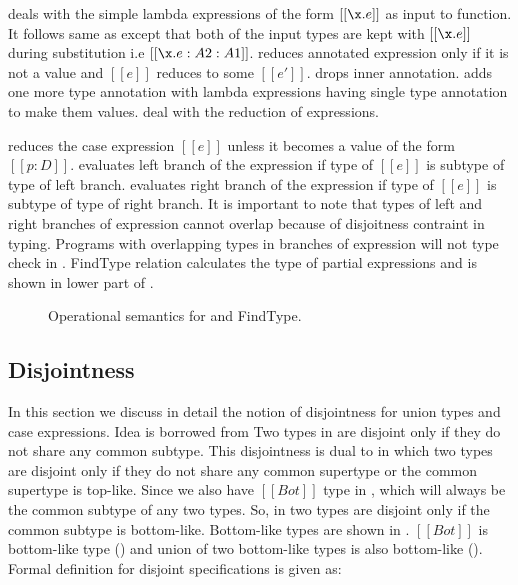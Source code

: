  deals with the simple lambda expressions of the form $[[\x.e]]$ as input to function.
It follows same as  except that both of the input types are kept with $[[\x.e]]$ during
substitution i.e $[[\x.e:A2:A1]]$.  reduces annotated expression only if it is not a value
and $[[e]]$ reduces to some $[[e']]$.  drops inner annotation.  adds one
more type annotation with lambda expressions having single type annotation to make them values.
 deal with the reduction of \typeof expressions.

 reduces the case expression $[[e]]$ unless it becomes a value of the form $[[p:D]]$.
 evaluates left branch of the \typeof expression if type of $[[e]]$ is subtype
of type of left branch.
 evaluates right branch of the \typeof expression if type of $[[e]]$ is subtype
of type of right branch.
It is important to note that types of left and right branches of \typeof expression cannot overlap
because of disjoitness contraint in typing. Programs with overlapping types in branches of \typeof
expression will not type check in \cal. FindType relation calculates the type of partial expressions
and is shown in lower part of .

\begin{figure}[t]
  \begin{small}
    \centering
  \end{small}
  \begin{small}
    \centering
  \end{small}
  \caption{Operational semantics for \dut and FindType.}
  \label{fig:union:os}
\end{figure}

\subsection{Disjointness}
\label{sec:union:disj}
In this section we discuss in detail the notion of disjointness for union types and case expressions.
Idea is borrowed from  Two types in \cal are disjoint
only if they do not share any common subtype. This disjointness is dual to 
 in which two types are disjoint only if they do not
share any common supertype or the common supertype is top-like. Since we also have $[[Bot]]$ type
in \cal, which will always be the common subtype of any two types. So, in \cal two types are
disjoint only if the common subtype is bottom-like. Bottom-like types are shown in
. $[[Bot]]$ is bottom-like type () and union of two bottom-like
types is also bottom-like (). 
Formal definition for disjoint specifications is given as:

